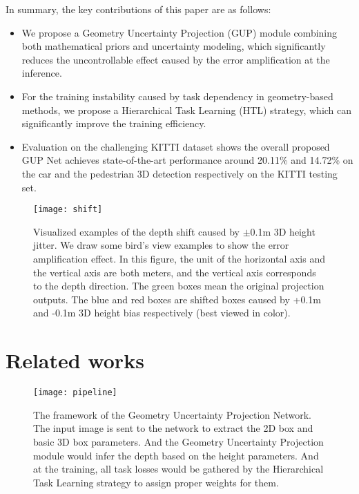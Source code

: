 \documentclass[10pt,twocolumn,letterpaper]{article}
\begin{document}
 

\iffalse 
\begin{figure}[t]
\begin{center}
\texttt{[image: geometry\_projection.pdf]}
\end{center}
   \caption{The principle of the geometry projection models. $f$ is the focal length provided by the camera intrinsic parameters.}
\label{fig:project_pipe}
\end{figure}
\fi








In summary, the key contributions of this paper are as follows:
\begin{itemize}
\item We propose a Geometry Uncertainty Projection (GUP) module combining both mathematical priors and uncertainty modeling, which significantly reduces the uncontrollable effect caused by the error amplification at the inference. 
    \item For the training instability caused by task dependency in geometry-based methods, we propose a Hierarchical Task Learning (HTL) strategy, which can significantly improve the training efficiency.
    \item Evaluation on the challenging KITTI dataset shows the overall proposed GUP Net achieves state-of-the-art performance around 20.11\% and 14.72\% on the car and the pedestrian 3D detection respectively on the KITTI testing set.
\end{itemize}
\begin{figure}[t]
\begin{center}
\texttt{[image: shift]}
\end{center}
   \caption{Visualized examples of the depth shift caused by $\pm$0.1m 3D height jitter. We draw some bird's view examples to show the error amplification effect. In this figure, the unit of the horizontal axis and the vertical axis are both meters, and the vertical axis corresponds to the depth direction. The \textcolor[RGB]{50,205,50}{green} boxes mean the original projection outputs. The \textcolor[RGB]{0,102,153}{
  blue} and \textcolor[RGB]{178,34,34}{red} boxes are shifted boxes caused by +0.1m and -0.1m 3D height bias respectively (best viewed in color). }
\label{fig:shift}
\end{figure} 
\section{Related works}
\begin{figure*}[t]
\begin{center}
\texttt{[image: pipeline]}
\end{center}
   \caption{The framework of the Geometry Uncertainty Projection Network. The input image is sent to the network to extract the 2D box and basic 3D box parameters. And the Geometry Uncertainty Projection module would infer the depth based on the height parameters. And at the training, all task losses would be gathered by the Hierarchical Task Learning strategy to assign proper weights for them. }
\label{fig:pipeline}
\end{figure*}
\end{document}
